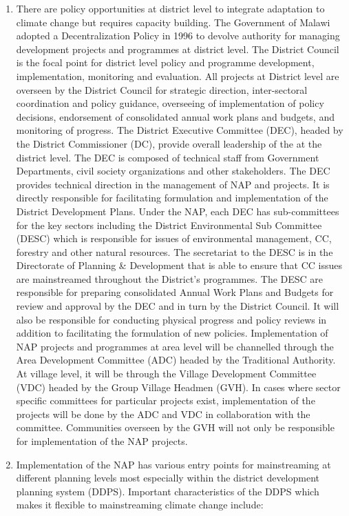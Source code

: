 \documentclass[
]{book}
\begin{document}
\begin{enumerate}
\item
  There are policy opportunities at district level to integrate adaptation to climate change but requires capacity building. The Government of Malawi adopted a Decentralization Policy in 1996 to devolve authority for managing development projects and programmes at district level. The District Council is the focal point for district level policy and programme development, implementation, monitoring and evaluation. All projects at District level are overseen by the District Council for strategic direction, inter-sectoral coordination and policy guidance, overseeing of implementation of policy decisions, endorsement of consolidated annual work plans and budgets, and monitoring of progress. The District Executive Committee (DEC), headed by the District Commissioner (DC), provide overall leadership of the at the district level. The DEC is composed of technical staff from Government Departments, civil society organizations and other stakeholders. The DEC provides technical direction in the management of NAP and projects. It is directly responsible for facilitating formulation and implementation of the District Development Plans. Under the NAP, each DEC has sub-committees for the key sectors including the District Environmental Sub Committee (DESC) which is responsible for issues of environmental management, CC, forestry and other natural resources. The secretariat to the DESC is in the Directorate of Planning \& Development that is able to ensure that CC issues are mainstreamed throughout the District's programmes. The DESC are responsible for preparing consolidated Annual Work Plans and Budgets for review and approval by the DEC and in turn by the District Council. It will also be responsible for conducting physical progress and policy reviews in addition to facilitating the formulation of new policies. Implementation of NAP projects and programmes at area level will be channelled through the Area Development Committee (ADC) headed by the Traditional Authority. At village level, it will be through the Village Development Committee (VDC) headed by the Group Village Headmen (GVH). In cases where sector specific committees for particular projects exist, implementation of the projects will be done by the ADC and VDC in collaboration with the committee. Communities overseen by the GVH will not only be responsible for implementation of the NAP projects.
\item
  Implementation of the NAP has various entry points for mainstreaming at different planning levels most especially within the district development planning system (DDPS). Important characteristics of the DDPS which makes it flexible to mainstreaming climate change include:
\end{enumerate}
\end{document}
